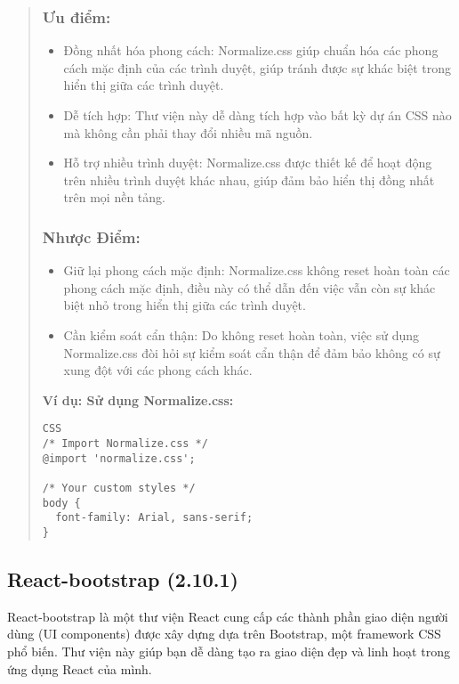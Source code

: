\begin{quote}
\subsubsection{Ưu điểm:}
\begin{itemize}
  \item Đồng nhất hóa phong cách: Normalize.css giúp chuẩn hóa các phong cách mặc định của các trình duyệt, giúp tránh được sự khác biệt trong hiển thị giữa các trình duyệt.
  \item Dễ tích hợp: Thư viện này dễ dàng tích hợp vào bất kỳ dự án CSS nào mà không cần phải thay đổi nhiều mã nguồn.
  \item Hỗ trợ nhiều trình duyệt: Normalize.css được thiết kế để hoạt động trên nhiều trình duyệt khác nhau, giúp đảm bảo hiển thị đồng nhất trên mọi nền tảng.
\end{itemize}

\subsubsection{Nhược Điểm:}
\begin{itemize}
  \item Giữ lại phong cách mặc định: Normalize.css không reset hoàn toàn các phong cách mặc định, điều này có thể dẫn đến việc vẫn còn sự khác biệt nhỏ trong hiển thị giữa các trình duyệt.
  \item Cần kiểm soát cẩn thận: Do không reset hoàn toàn, việc sử dụng Normalize.css đòi hỏi sự kiểm soát cẩn thận để đảm bảo không có sự xung đột với các phong cách khác.
\end{itemize}

\textbf{Ví dụ: Sử dụng Normalize.css:}
\begin{lstlisting}
CSS
/* Import Normalize.css */
@import 'normalize.css';

/* Your custom styles */
body {
  font-family: Arial, sans-serif;
}
\end{lstlisting}
\end{quote}


\subsection{React-bootstrap (2.10.1)}

React-bootstrap là một thư viện React cung cấp các thành phần giao diện người dùng (UI components) được xây dựng dựa trên Bootstrap, một framework CSS phổ biến. Thư viện này giúp bạn dễ dàng tạo ra giao diện đẹp và linh hoạt trong ứng dụng React của mình.


